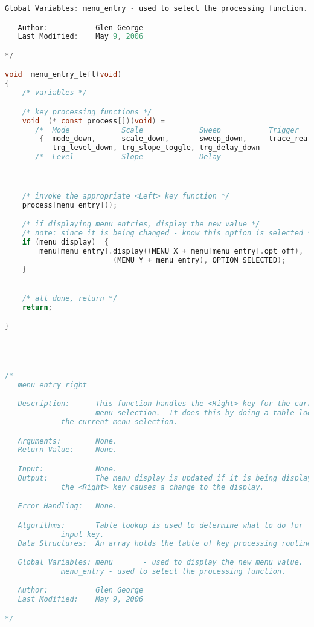 \begin{lstlisting}[language=C]
   Global Variables: menu_entry - used to select the processing function.

   Author:           Glen George
   Last Modified:    May 9, 2006

*/

void  menu_entry_left(void)
{
    /* variables */

    /* key processing functions */
    void  (* const process[])(void) =
       /*  Mode            Scale             Sweep           Trigger      */
        {  mode_down,      scale_down,       sweep_down,     trace_rearm,
           trg_level_down, trg_slope_toggle, trg_delay_down               };
       /*  Level           Slope             Delay                        */



    /* invoke the appropriate <Left> key function */
    process[menu_entry]();

    /* if displaying menu entries, display the new value */
    /* note: since it is being changed - know this option is selected */
    if (menu_display)  {
        menu[menu_entry].display((MENU_X + menu[menu_entry].opt_off),
    			         (MENU_Y + menu_entry), OPTION_SELECTED);
    }


    /* all done, return */
    return;

}




/*
   menu_entry_right

   Description:      This function handles the <Right> key for the current
                     menu selection.  It does this by doing a table lookup on
		     the current menu selection.

   Arguments:        None.
   Return Value:     None.

   Input:            None.
   Output:           The menu display is updated if it is being displayed and
   		     the <Right> key causes a change to the display.

   Error Handling:   None.

   Algorithms:       Table lookup is used to determine what to do for the
   		     input key.
   Data Structures:  An array holds the table of key processing routines.

   Global Variables: menu       - used to display the new menu value.
   		     menu_entry - used to select the processing function.

   Author:           Glen George
   Last Modified:    May 9, 2006

*/


\end{lstlisting}
